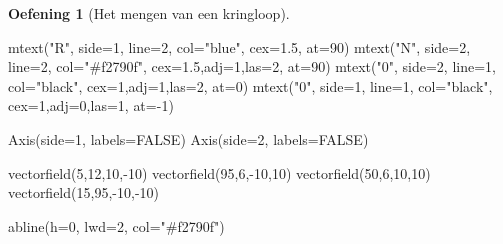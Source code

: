 \documentclass[
  a4paper,
]{scrbook}
\newenvironment{Shaded}{\begin{snugshade}}{\end{snugshade}}
\newcommand{\AttributeTok}[1]{\textcolor[rgb]{0.40,0.45,0.13}{#1}}
\newcommand{\ConstantTok}[1]{\textcolor[rgb]{0.56,0.35,0.01}{#1}}
\newcommand{\DecValTok}[1]{\textcolor[rgb]{0.68,0.00,0.00}{#1}}
\newcommand{\FloatTok}[1]{\textcolor[rgb]{0.68,0.00,0.00}{#1}}
\newcommand{\FunctionTok}[1]{\textcolor[rgb]{0.28,0.35,0.67}{#1}}
\newcommand{\NormalTok}[1]{\textcolor[rgb]{0.00,0.23,0.31}{#1}}
\newcommand{\SpecialCharTok}[1]{\textcolor[rgb]{0.37,0.37,0.37}{#1}}
\newcommand{\StringTok}[1]{\textcolor[rgb]{0.13,0.47,0.30}{#1}}
\theoremstyle{definition}
\newtheorem{exercise}{Oefening}[chapter]
\theoremstyle{remark}
\begin{document}
\begin{exercise}[Het mengen van een
kringloop]
\begin{Shaded}
\begin{Highlighting}[]
\FunctionTok{mtext}\NormalTok{(}\StringTok{"R"}\NormalTok{, }\AttributeTok{side=}\DecValTok{1}\NormalTok{, }\AttributeTok{line=}\DecValTok{2}\NormalTok{, }\AttributeTok{col=}\StringTok{"blue"}\NormalTok{, }\AttributeTok{cex=}\FloatTok{1.5}\NormalTok{, }\AttributeTok{at=}\DecValTok{90}\NormalTok{)}
\FunctionTok{mtext}\NormalTok{(}\StringTok{"N"}\NormalTok{, }\AttributeTok{side=}\DecValTok{2}\NormalTok{, }\AttributeTok{line=}\DecValTok{2}\NormalTok{, }\AttributeTok{col=}\StringTok{"\#f2790f"}\NormalTok{, }\AttributeTok{cex=}\FloatTok{1.5}\NormalTok{,}\AttributeTok{adj=}\DecValTok{1}\NormalTok{,}\AttributeTok{las=}\DecValTok{2}\NormalTok{, }\AttributeTok{at=}\DecValTok{90}\NormalTok{)}
\FunctionTok{mtext}\NormalTok{(}\StringTok{"0"}\NormalTok{, }\AttributeTok{side=}\DecValTok{2}\NormalTok{, }\AttributeTok{line=}\DecValTok{1}\NormalTok{, }\AttributeTok{col=}\StringTok{"black"}\NormalTok{, }\AttributeTok{cex=}\DecValTok{1}\NormalTok{,}\AttributeTok{adj=}\DecValTok{1}\NormalTok{,}\AttributeTok{las=}\DecValTok{2}\NormalTok{, }\AttributeTok{at=}\DecValTok{0}\NormalTok{)}
\FunctionTok{mtext}\NormalTok{(}\StringTok{"0"}\NormalTok{, }\AttributeTok{side=}\DecValTok{1}\NormalTok{, }\AttributeTok{line=}\DecValTok{1}\NormalTok{, }\AttributeTok{col=}\StringTok{"black"}\NormalTok{, }\AttributeTok{cex=}\DecValTok{1}\NormalTok{,}\AttributeTok{adj=}\DecValTok{0}\NormalTok{,}\AttributeTok{las=}\DecValTok{1}\NormalTok{, }\AttributeTok{at=}\SpecialCharTok{{-}}\DecValTok{1}\NormalTok{)}

\FunctionTok{Axis}\NormalTok{(}\AttributeTok{side=}\DecValTok{1}\NormalTok{, }\AttributeTok{labels=}\ConstantTok{FALSE}\NormalTok{)}
\FunctionTok{Axis}\NormalTok{(}\AttributeTok{side=}\DecValTok{2}\NormalTok{, }\AttributeTok{labels=}\ConstantTok{FALSE}\NormalTok{)}

\FunctionTok{vectorfield}\NormalTok{(}\DecValTok{5}\NormalTok{,}\DecValTok{12}\NormalTok{,}\DecValTok{10}\NormalTok{,}\SpecialCharTok{{-}}\DecValTok{10}\NormalTok{)}
\FunctionTok{vectorfield}\NormalTok{(}\DecValTok{95}\NormalTok{,}\DecValTok{6}\NormalTok{,}\SpecialCharTok{{-}}\DecValTok{10}\NormalTok{,}\DecValTok{10}\NormalTok{)}
\FunctionTok{vectorfield}\NormalTok{(}\DecValTok{50}\NormalTok{,}\DecValTok{6}\NormalTok{,}\DecValTok{10}\NormalTok{,}\DecValTok{10}\NormalTok{)}
\FunctionTok{vectorfield}\NormalTok{(}\DecValTok{15}\NormalTok{,}\DecValTok{95}\NormalTok{,}\SpecialCharTok{{-}}\DecValTok{10}\NormalTok{,}\SpecialCharTok{{-}}\DecValTok{10}\NormalTok{)}

\FunctionTok{abline}\NormalTok{(}\AttributeTok{h=}\DecValTok{0}\NormalTok{, }\AttributeTok{lwd=}\DecValTok{2}\NormalTok{, }\AttributeTok{col=}\StringTok{"\#f2790f"}\NormalTok{)}


\end{Highlighting}
\end{Shaded}
\end{exercise}
\end{document}
